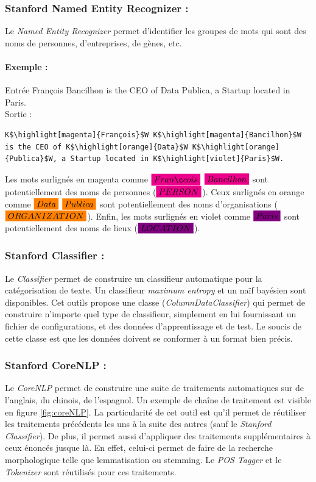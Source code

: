             \subsubsection{Stanford Named Entity Recognizer :}
                Le \textit{Named Entity Recognizer} permet d'identifier les groupes de mots qui sont des noms de personnes, d'entreprises, de gènes, etc.

                \paragraph{Exemple :}
                Entrée \og François Bancilhon is the CEO of Data Publica, a Startup located in Paris.\fg\\
                Sortie :
\begin{lstlisting}
K$\highlight[magenta]{François}$W K$\highlight[magenta]{Bancilhon}$W is the CEO of K$\highlight[orange]{Data}$W K$\highlight[orange]{Publica}$W, a Startup located in K$\highlight[violet]{Paris}$W.
\end{lstlisting}
                Les mots surlignés en magenta comme $\highlight[magenta]{François}$ $\highlight[magenta]{Bancilhon}$ sont potentiellement des noms de personnes (\textit{$\highlight[magenta]{PERSON}$}). Ceux surlignés en orange comme $\highlight[orange]{Data}$ $\highlight[orange]{Publica}$ sont potentiellement des noms d'organisations (\textit{$\highlight[orange]{ORGANIZATION}$}). Enfin, les mots surlignés en violet comme $\highlight[violet]{Paris}$ sont potentiellement des noms de lieux (\textit{$\highlight[violet]{LOCATION}$}).

            \subsubsection{Stanford Classifier :}
                Le \textit{Classifier} permet de construire un classifieur automatique pour la catégorisation de texte. Un classifieur \textit{maximum entropy} et un naïf bayésien sont disponibles. Cet outils propose une classe (\textit{ColumnDataClassifier}) qui permet de construire n'importe quel type de classifieur, simplement en lui fournissant un fichier de configurations, et des données d'apprentissage et de test. Le soucis de cette classe est que les données doivent se conformer à un format bien précis.

            \subsubsection{Stanford CoreNLP :}
                Le \textit{CoreNLP} permet de construire une suite de traitements automatiques sur de l'anglais, du chinois, de l'espagnol. Un exemple de chaîne de traitement est visible en figure \ref{fig:coreNLP}. La particularité de cet outil est qu'il permet de réutiliser les traitements précédents les uns à la suite des autres (sauf le \textit{Stanford Classifier}). De plus, il permet aussi d'appliquer des traitements supplémentaires à ceux énoncés jusque là. En effet, celui-ci permet de faire de la recherche morphologique telle que lemmatisation ou stemming. Le \textit{POS Tagger} et le \textit{Tokenizer} sont réutilisés pour ces traitements.

